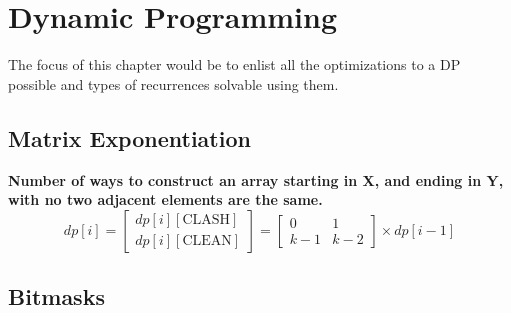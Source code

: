 \chapter{Dynamic Programming}

The focus of this chapter would be to enlist all the optimizations to a DP possible and types of recurrences solvable using them.



\section{Matrix Exponentiation}


\begin{example}{}
\textbf{Number of ways to construct an array starting in X, and ending in Y, with no two adjacent elements are the same.}
\begin{equation*}
    dp[i] = \begin{bmatrix} dp[i][\text{CLASH}] \\ dp[i][\text{CLEAN}] \end{bmatrix}
    = \begin{bmatrix} 0 & 1 \\ k-1 & k-2 \end{bmatrix} \times dp[i-1]
\end{equation*}
\end{example}


\section{Bitmasks}

